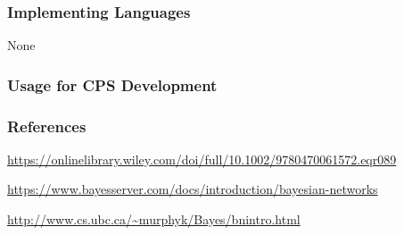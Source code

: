 
\subsubsection{Implementing Languages}

None

\subsubsection{Usage for CPS Development}

\cite{POC2011}
\cite{KST2014}
\cite{N2013}


\subsubsection{References}

\url{https://onlinelibrary.wiley.com/doi/full/10.1002/9780470061572.eqr089}
	
\url{https://www.bayesserver.com/docs/introduction/bayesian-networks}
	
\url{http://www.cs.ubc.ca/~murphyk/Bayes/bnintro.html}




